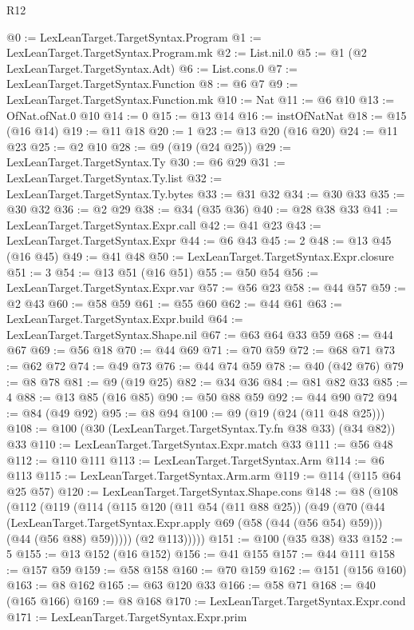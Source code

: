 \begin{lexlean}{R12}
\begin{coremodule}
@0 := LexLeanTarget.TargetSyntax.Program
@1 := LexLeanTarget.TargetSyntax.Program.mk
@2 := List.nil.{0}
@5 := @1 (@2 LexLeanTarget.TargetSyntax.Adt)
@6 := List.cons.{0}
@7 := LexLeanTarget.TargetSyntax.Function
@8 := @6 @7
@9 := LexLeanTarget.TargetSyntax.Function.mk
@10 := Nat
@11 := @6 @10
@13 := OfNat.ofNat.{0} @10
@14 := 0
@15 := @13 @14
@16 := instOfNatNat
@18 := @15 (@16 @14)
@19 := @11 @18
@20 := 1
@23 := @13 @20 (@16 @20)
@24 := @11 @23
@25 := @2 @10
@28 := @9 (@19 (@24 @25))
@29 := LexLeanTarget.TargetSyntax.Ty
@30 := @6 @29
@31 := LexLeanTarget.TargetSyntax.Ty.list
@32 := LexLeanTarget.TargetSyntax.Ty.bytes
@33 := @31 @32
@34 := @30 @33
@35 := @30 @32
@36 := @2 @29
@38 := @34 (@35 @36)
@40 := @28 @38 @33
@41 := LexLeanTarget.TargetSyntax.Expr.call
@42 := @41 @23
@43 := LexLeanTarget.TargetSyntax.Expr
@44 := @6 @43
@45 := 2
@48 := @13 @45 (@16 @45)
@49 := @41 @48
@50 := LexLeanTarget.TargetSyntax.Expr.closure
@51 := 3
@54 := @13 @51 (@16 @51)
@55 := @50 @54
@56 := LexLeanTarget.TargetSyntax.Expr.var
@57 := @56 @23
@58 := @44 @57
@59 := @2 @43
@60 := @58 @59
@61 := @55 @60
@62 := @44 @61
@63 := LexLeanTarget.TargetSyntax.Expr.build
@64 := LexLeanTarget.TargetSyntax.Shape.nil
@67 := @63 @64 @33 @59
@68 := @44 @67
@69 := @56 @18
@70 := @44 @69
@71 := @70 @59
@72 := @68 @71
@73 := @62 @72
@74 := @49 @73
@76 := @44 @74 @59
@78 := @40 (@42 @76)
@79 := @8 @78
@81 := @9 (@19 @25)
@82 := @34 @36
@84 := @81 @82 @33
@85 := 4
@88 := @13 @85 (@16 @85)
@90 := @50 @88 @59
@92 := @44 @90 @72
@94 := @84 (@49 @92)
@95 := @8 @94
@100 := @9 (@19 (@24 (@11 @48 @25)))
@108 := @100 (@30 (LexLeanTarget.TargetSyntax.Ty.fn @38 @33) (@34 @82)) @33
@110 := LexLeanTarget.TargetSyntax.Expr.match @33
@111 := @56 @48
@112 := @110 @111
@113 := LexLeanTarget.TargetSyntax.Arm
@114 := @6 @113
@115 := LexLeanTarget.TargetSyntax.Arm.arm
@119 := @114 (@115 @64 @25 @57)
@120 := LexLeanTarget.TargetSyntax.Shape.cons
@148 := @8
    (@108
      (@112
        (@119
          (@114
            (@115
              @120
              (@11 @54 (@11 @88 @25))
              (@49
                (@70
                  (@44
                    (LexLeanTarget.TargetSyntax.Expr.apply @69 (@58 (@44 (@56 @54) @59)))
                    (@44 (@56 @88) @59)))))
            (@2 @113)))))
@151 := @100 (@35 @38) @33
@152 := 5
@155 := @13 @152 (@16 @152)
@156 := @41 @155
@157 := @44 @111
@158 := @157 @59
@159 := @58 @158
@160 := @70 @159
@162 := @151 (@156 @160)
@163 := @8 @162
@165 := @63 @120 @33
@166 := @58 @71
@168 := @40 (@165 @166)
@169 := @8 @168
@170 := LexLeanTarget.TargetSyntax.Expr.cond
@171 := LexLeanTarget.TargetSyntax.Expr.prim

\end{coremodule}
\end{lexlean}
